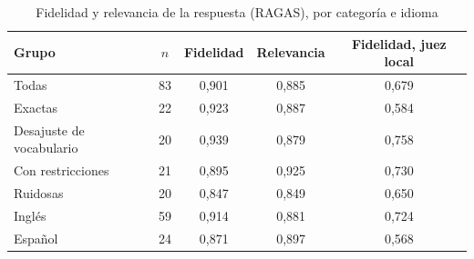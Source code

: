 \begin{table}[htbp!]
    \centering
    \caption{Fidelidad y relevancia de la respuesta (RAGAS), por categoría e idioma}
    \label{tab:res-pe2}
    \begin{tabular}{|l|c|c|c|c|}
        \hline
        \textbf{Grupo} & \textbf{$n$} & \textbf{Fidelidad} & \textbf{Relevancia} & \textbf{Fidelidad, juez local} \\
        \hline
        Todas & 83 & 0{,}901 & 0{,}885 & 0{,}679 \\
        \hline
        Exactas & 22 & 0{,}923 & 0{,}887 & 0{,}584 \\
        \hline
        Desajuste de vocabulario & 20 & 0{,}939 & 0{,}879 & 0{,}758 \\
        \hline
        Con restricciones & 21 & 0{,}895 & 0{,}925 & 0{,}730 \\
        \hline
        Ruidosas & 20 & 0{,}847 & 0{,}849 & 0{,}650 \\
        \hline
        Inglés & 59 & 0{,}914 & 0{,}881 & 0{,}724 \\
        \hline
        Español & 24 & 0{,}871 & 0{,}897 & 0{,}568 \\
        \hline
    \end{tabular}
\end{table}
